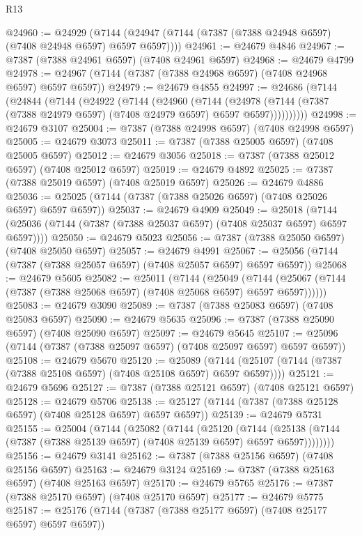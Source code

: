 \begin{lexlean}{R13}
\begin{coremodule}
@24960 := @24929
    (@7144 (@24947 (@7144 (@7387 (@7388 @24948 @6597) (@7408 @24948 @6597) @6597 @6597))))
@24961 := @24679 @4846
@24967 := @7387 (@7388 @24961 @6597) (@7408 @24961 @6597)
@24968 := @24679 @4799
@24978 := @24967 (@7144 (@7387 (@7388 @24968 @6597) (@7408 @24968 @6597) @6597 @6597))
@24979 := @24679 @4855
@24997 := @24686
    (@7144
      (@24844
        (@7144
          (@24922
            (@7144
              (@24960
                (@7144
                  (@24978
                    (@7144 (@7387 (@7388 @24979 @6597) (@7408 @24979 @6597) @6597 @6597))))))))))
@24998 := @24679 @3107
@25004 := @7387 (@7388 @24998 @6597) (@7408 @24998 @6597)
@25005 := @24679 @3073
@25011 := @7387 (@7388 @25005 @6597) (@7408 @25005 @6597)
@25012 := @24679 @3056
@25018 := @7387 (@7388 @25012 @6597) (@7408 @25012 @6597)
@25019 := @24679 @4892
@25025 := @7387 (@7388 @25019 @6597) (@7408 @25019 @6597)
@25026 := @24679 @4886
@25036 := @25025 (@7144 (@7387 (@7388 @25026 @6597) (@7408 @25026 @6597) @6597 @6597))
@25037 := @24679 @4909
@25049 := @25018
    (@7144 (@25036 (@7144 (@7387 (@7388 @25037 @6597) (@7408 @25037 @6597) @6597 @6597))))
@25050 := @24679 @5023
@25056 := @7387 (@7388 @25050 @6597) (@7408 @25050 @6597)
@25057 := @24679 @4991
@25067 := @25056 (@7144 (@7387 (@7388 @25057 @6597) (@7408 @25057 @6597) @6597 @6597))
@25068 := @24679 @5605
@25082 := @25011
    (@7144
      (@25049
        (@7144 (@25067 (@7144 (@7387 (@7388 @25068 @6597) (@7408 @25068 @6597) @6597 @6597))))))
@25083 := @24679 @3090
@25089 := @7387 (@7388 @25083 @6597) (@7408 @25083 @6597)
@25090 := @24679 @5635
@25096 := @7387 (@7388 @25090 @6597) (@7408 @25090 @6597)
@25097 := @24679 @5645
@25107 := @25096 (@7144 (@7387 (@7388 @25097 @6597) (@7408 @25097 @6597) @6597 @6597))
@25108 := @24679 @5670
@25120 := @25089
    (@7144 (@25107 (@7144 (@7387 (@7388 @25108 @6597) (@7408 @25108 @6597) @6597 @6597))))
@25121 := @24679 @5696
@25127 := @7387 (@7388 @25121 @6597) (@7408 @25121 @6597)
@25128 := @24679 @5706
@25138 := @25127 (@7144 (@7387 (@7388 @25128 @6597) (@7408 @25128 @6597) @6597 @6597))
@25139 := @24679 @5731
@25155 := @25004
    (@7144
      (@25082
        (@7144
          (@25120
            (@7144
              (@25138 (@7144 (@7387 (@7388 @25139 @6597) (@7408 @25139 @6597) @6597 @6597))))))))
@25156 := @24679 @3141
@25162 := @7387 (@7388 @25156 @6597) (@7408 @25156 @6597)
@25163 := @24679 @3124
@25169 := @7387 (@7388 @25163 @6597) (@7408 @25163 @6597)
@25170 := @24679 @5765
@25176 := @7387 (@7388 @25170 @6597) (@7408 @25170 @6597)
@25177 := @24679 @5775
@25187 := @25176 (@7144 (@7387 (@7388 @25177 @6597) (@7408 @25177 @6597) @6597 @6597))

\end{coremodule}
\end{lexlean}
